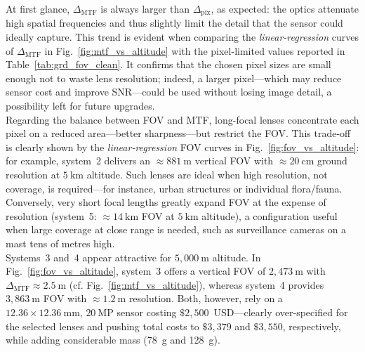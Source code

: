 \noindent At first glance, \(\Delta_{\mathrm{MTF}}\) is always larger than
\(\Delta_{\mathrm{pix}}\), as expected: the optics attenuate high
spatial frequencies and thus slightly limit the detail that the sensor could
ideally capture. This trend is evident when comparing the
\emph{linear-regression} curves of \(\Delta_{\mathrm{MTF}}\) in
Fig.~\ref{fig:mtf_vs_altitude} with the pixel-limited values reported in
Table~\ref{tab:grd_fov_clean}. It confirms that the chosen pixel sizes are
small enough not to waste lens resolution; indeed, a larger pixel—which may
reduce sensor cost and improve SNR—could be used without losing image
detail, a possibility left for future upgrades.\\[4pt]


\noindent Regarding the balance between FOV and MTF, long-focal lenses
concentrate each pixel on a reduced area—better sharpness—but restrict the
FOV. This trade-off is clearly shown by the \emph{linear-regression} FOV
curves in Fig.~\ref{fig:fov_vs_altitude}: for example, system~2 delivers an
\(\approx 881~\mathrm{m}\) vertical FOV with \(\approx 20~\mathrm{cm}\)
ground resolution at \(5~\mathrm{km}\) altitude. Such lenses are ideal when
high resolution, not coverage, is required—for instance, urban structures or
individual flora/fauna. Conversely, very short focal lengths greatly expand
FOV at the expense of resolution (system~5: \(\approx 14~\mathrm{km}\) FOV at
\(5~\mathrm{km}\) altitude), a configuration useful when large coverage at
close range is needed, such as surveillance cameras on a mast tens of metres
high.\\[4pt]

\noindent Systems~3 and~4 appear attractive for \(5{,}000~\mathrm{m}\)
altitude. In Fig.~\ref{fig:fov_vs_altitude}, system~3 offers a vertical FOV
of \(2{,}473~\mathrm{m}\) with \(\Delta_{\mathrm{MTF}}\approx 2.5~\mathrm{m}\)
(cf. Fig.~\ref{fig:mtf_vs_altitude}), whereas system~4 provides
\(3{,}863~\mathrm{m}\) FOV with \(\approx 1.2~\mathrm{m}\) resolution.
Both, however, rely on a \(12.36\times 12.36~\mathrm{mm}\), \(20~\mathrm{MP}\)
sensor costing \(\$2{,}500\)~USD—clearly over-specified for the selected lenses
and pushing total costs to \(\$3{,}379\) and \(\$3{,}550\), respectively,
while adding considerable mass (78~g and 128~g).\\[4pt]


